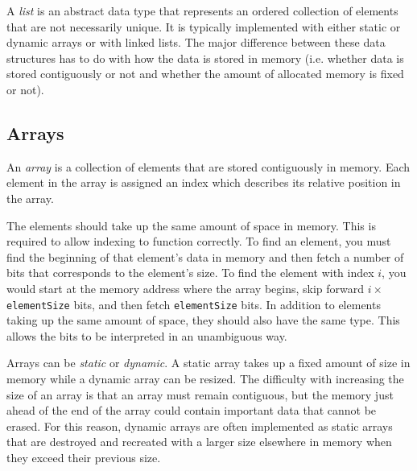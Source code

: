 A \textit{list} is an abstract data type that represents an ordered collection of elements that are not necessarily unique. It is typically implemented with either static or dynamic arrays or with linked lists. The major difference between these data structures has to do with how the data is stored in memory (i.e. whether data is stored contiguously or not and whether the amount of allocated memory is fixed or not).

\subsection{Arrays}

An \textit{array} is a collection of elements that are stored contiguously in memory. Each element in the array is assigned an index which describes its relative position in the array.

The elements should take up the same amount of space in memory. This is required to allow indexing to function correctly. To find an element, you must find the beginning of that element's data in memory and then fetch a number of bits that corresponds to the element's size. To find the element with index $i$, you would start at the memory address where the array begins, skip forward $i\times$\texttt{elementSize} bits, and then fetch \texttt{elementSize} bits. In addition to elements taking up the same amount of space, they should also have the same type. This allows the bits to be interpreted in an unambiguous way.

Arrays can be \textit{static} or \textit{dynamic}. A static array takes up a fixed amount of size in memory while a dynamic array can be resized. The difficulty with increasing the size of an array is that an array must remain contiguous, but the memory just ahead of the end of the array could contain important data that cannot be erased. For this reason, dynamic arrays are often implemented as static arrays that are destroyed and recreated with a larger size elsewhere in memory when they exceed their previous size.

